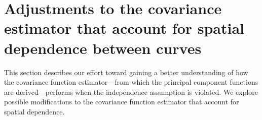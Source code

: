 

\newpage

\section{Adjustments to the covariance estimator that account for spatial dependence between curves} 

\label{sec:investigating_the_effects_of_spatial_dependence}

This section describes our effort toward gaining a better understanding of how the covariance function estimator---from which the principal component functions are derived---performs when the independence assumption is violated. We explore possible modifications to the covariance function estimator that account for spatial dependence. 

